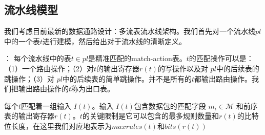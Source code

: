 \documentclass{ctexart}
\newcommand{\para}[1]{\smallskip\noindent {\bf #1}}
\begin{document}






\subsection{流水线模型}
\label{subsec:pipeline-model}

我们考虑目前最新的数据通路设计：多流表流水线架构。我们首先对一个流水线$pl$中的一个表$t$进行建模，然后给出对于流水线的清晰定义。


\para{流水线中的表}： 每个流水线中的表$t \in pl$是精准匹配的match-action表。$t$的匹配操作可以是：（1）一个路由操作；（2）对$t$的输出寄存器$r(t)$的写操作以及对 $pl$中的后续表的跳操作；（3）对 $pl$中的后续表的简单跳操作。并不是所有的$t$都输出路由操作。我们把输出路由操作的$t$称为出口表。

每个$t$匹配着一组输入 $I(t)$。输入 $I(t)$包含数据包的匹配字段 $m_i \in \mathcal{M}$ 和前序表的输出寄存器$r(t)$。$t$的关键限制是它可以包含的最多规则数量和$r(t)$的比特位长度，在这里我们对应地表示为$maxrules(t)$和$bits(r(t))$ 
\end{document}
